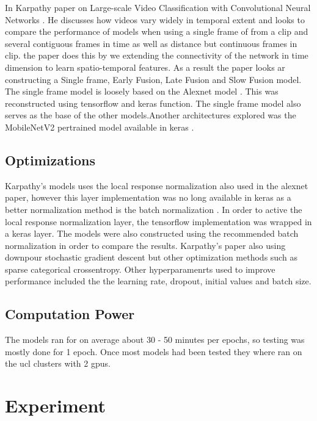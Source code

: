 \documentclass{article}
\begin{document}
    In Karpathy paper on Large-scale Video Classification with Convolutional Neural Networks \citep{KarpathyCVPR14}.
    He discusses how videos vary widely in temporal extent and looks to compare the performance of models when using a single frame of from a clip and several contiguous frames in time as well as distance but continuous frames in clip.
    the paper does this by we extending the connectivity of the network in time dimension to learn spatio-temporal features.
    As a result the paper looks ar constructing a Single frame, Early Fusion, Late Fusion and Slow Fusion model.
    The single frame model is loosely based on the Alexnet model \cite{NIPS2012_4824}. This was reconstructed using tensorflow and keras function.
    The single frame model also serves as the base of the other models.Another architectures explored was the MobileNetV2 pertrained model available in keras \cite{Sandler_2018}.

    \subsection{Optimizations}

    Karpathy's models uses the local response normalization \cite{ROBINSON20071631} also used in the alexnet paper\cite{NIPS2012_4824}, however this layer implementation was no long available in keras as a better normalization method is the batch normalization \cite{ioffe2015batch}. In order to active the local response normalization layer, the tensorflow implementation was wrapped in a keras layer. The models were also constructed using the recommended batch normalization in order to compare the results.
    Karpathy's paper also using downpour stochastic gradient descent but other optimization methods such as sparse categorical crossentropy.
    Other hyperparamenrts used to improve performance included the  the learning rate, dropout, initial values and batch size.

    \subsection{Computation Power}
    The models ran for on average about 30 - 50 minutes per epochs, so testing was mostly done for 1 epoch. Once most models had been tested they where ran on the ucl clusters with 2 gpus.

    \section{Experiment}
\end{document}
